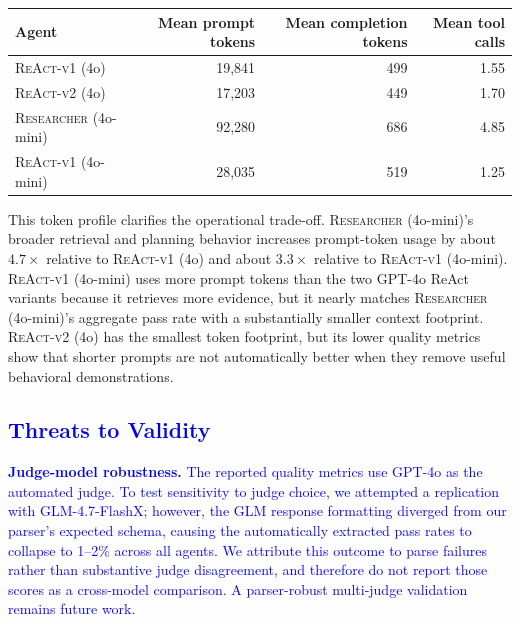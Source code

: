 \begin{center}
\small
\begin{tabular}{lrrr}
\toprule
\textbf{Agent} & \textbf{Mean prompt tokens} & \textbf{Mean completion tokens} & \textbf{Mean tool calls} \\
\midrule
\textsc{ReAct-v1} (4o)   & 19{,}841 & 499 & 1.55 \\
\textsc{ReAct-v2} (4o)   & 17{,}203 & 449 & 1.70 \\
\textsc{Researcher} (4o-mini) & 92{,}280 & 686 & 4.85 \\
\textsc{ReAct-v1} (4o-mini)   & 28{,}035 & 519 & 1.25 \\
\bottomrule
\end{tabular}
\end{center}

This token profile clarifies the operational trade-off. \textsc{Researcher} (4o-mini)'s broader retrieval and planning behavior increases prompt-token usage by about $4.7\times$ relative to \textsc{ReAct-v1} (4o) and about $3.3\times$ relative to \textsc{ReAct-v1} (4o-mini). \textsc{ReAct-v1} (4o-mini) uses more prompt tokens than the two GPT-4o ReAct variants because it retrieves more evidence, but it nearly matches \textsc{Researcher} (4o-mini)'s aggregate pass rate with a substantially smaller context footprint. \textsc{ReAct-v2} (4o) has the smallest token footprint, but its lower quality metrics show that shorter prompts are not automatically better when they remove useful behavioral demonstrations.

\subsection{\textcolor{blue}{Threats to Validity}}
\label{sec:threats}
\textcolor{blue}{\textbf{Judge-model robustness.} The reported quality metrics use GPT-4o as the automated judge. To test sensitivity to judge choice, we attempted a replication with GLM-4.7-FlashX; however, the GLM response formatting diverged from our parser's expected schema, causing the automatically extracted pass rates to collapse to 1--2\% across all agents. We attribute this outcome to parse failures rather than substantive judge disagreement, and therefore do not report those scores as a cross-model comparison. A parser-robust multi-judge validation remains future work.}
